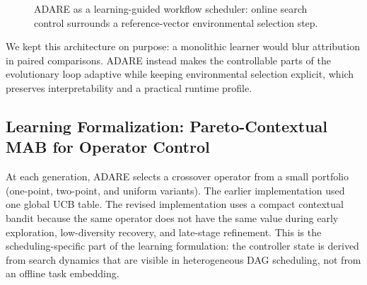 \documentclass[runningheads]{llncs}
\begin{document}
\begin{figure}[t]
\centering
{}
\caption{ADARE as a learning-guided workflow scheduler: online search control surrounds a reference-vector environmental selection step.}
\label{fig:adare_structure}
\end{figure}

We kept this architecture on purpose: a monolithic learner would blur attribution in paired comparisons. ADARE instead makes the controllable parts of the evolutionary loop adaptive while keeping environmental selection explicit, which preserves interpretability and a practical runtime profile.

\subsection{Learning Formalization: Pareto-Contextual MAB for Operator Control}
\label{sec:mab}
At each generation, ADARE selects a crossover operator from a small portfolio (one-point, two-point, and uniform variants). The earlier implementation used one global UCB table. The revised implementation uses a compact contextual bandit because the same operator does not have the same value during early exploration, low-diversity recovery, and late-stage refinement. This is the scheduling-specific part of the learning formulation: the controller state is derived from search dynamics that are visible in heterogeneous DAG scheduling, not from an offline task embedding.
\end{document}
